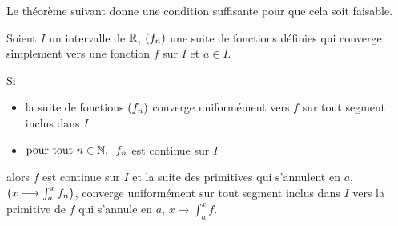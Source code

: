 Le théorème suivant donne une condition suffisante pour que cela soit faisable.

\begin{theo}
Soient \(I\) un intervalle de \(\mathbb{R}\), \(\left(f_n\right)\) une suite de fonctions définies qui converge simplement vers une fonction \(f\) sur \(I\) et \(a\in I\).

Si

\begin{itemize}
    \item la suite de fonctions \(\left(f_n\right)\) converge uniformément vers \(f\) sur tout segment inclus dans \(I\) \\
    \item \(\quantifs{\tpt n\in\N}f_n\) est continue sur \(I\)
\end{itemize}

alors \(f\) est continue sur \(I\) et la suite des primitives qui s'annulent en \(a\), \ie \(\left(x\longmapsto\int_a^xf_n\right)\), converge uniformément sur tout segment inclus dans \(I\) vers la primitive de \(f\) qui s'annule en \(a\), \ie \(x\mapsto\int_a^xf\).
\end{theo}

